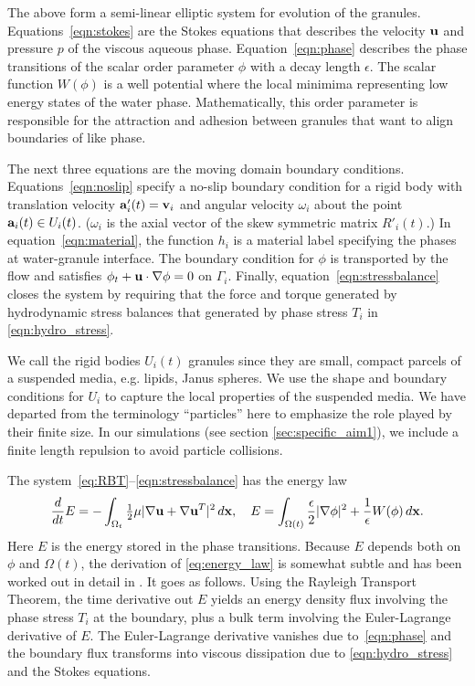 The above form a semi-linear elliptic 
system for evolution of the granules.  Equations~\eqref{eqn:stokes} are the
Stokes equations that describes the velocity $\uu$ and pressure $p$ of
the viscous aqueous phase.  Equation~\eqref{eqn:phase} describes the
phase transitions of the scalar order parameter $\phi$ with a decay
length $\epsilon$.
The scalar function $W(\phi)$ is a well potential where the local 
minimima representing low energy states of the water phase.
Mathematically, this order parameter is responsible for
the attraction and adhesion between granules that want to align boundaries
of like phase.

The next three equations are the moving domain boundary conditions.
Equations~\eqref{eqn:noslip} specify a no-slip
boundary condition for a rigid body with translation velocity $\aa'_i(t) = \vv_i$
and angular velocity $\omega_i$
about the point $\aa_i(t) \in U_i(t)$.
($\omega_i$ is the axial vector of the
skew symmetric matrix $R'_i(t)$.)
In
equation~\eqref{eqn:material}, the function $h_i$ is a material label
specifying the phases at water-granule interface.
The boundary condition for $\phi$ is transported by the flow
and satisfies $\phi_t + \uu \cdot \nabla \phi = 0$ on $\Gamma_i$.
Finally,
equation~\eqref{eqn:stressbalance} closes the system by
requiring that the force and torque generated by 
hydrodynamic stress balances that generated by phase stress $T_i$ in
\eqref{eqn:hydro_stress}.

We call the rigid bodies $U_i(t)$ granules since they are small, compact
parcels of a suspended media, e.g. lipids, Janus spheres.
We use the shape and boundary conditions for $U_i$ to capture the local
properties of the suspended media. 
We have departed from the terminology ``particles'' here
to emphasize the role played by their finite size. 
In our simulations (see section \ref{sec:specific_aim1}),
we include a finite length repulsion to avoid particle
collisions.




The system~\eqref{eq:RBT}--\eqref{eqn:stressbalance}
has the energy law
\begin{equation}
\label{eq:energy_law}
  \frac{d}{dt}E
  = - \int_{\Omega_t}\tfrac{1}{2}\mu|\nabla \uu + \nabla
  \uu^T|^2 \,d\xx,\quad
    E = \int_{\Omega(t)}
  \frac{\epsilon}{2} |\nabla \phi|^2 + \frac{1}{\epsilon} W(\phi) \,d\xx.
\end{equation}
Here $E$ is the energy stored in the phase transitions.
Because $E$ depends both on $\phi$ and $\Omega(t)$,
the derivation of \eqref{eq:energy_law}
is somewhat subtle and has been worked out in detail in \cite{Fu2018_SIAM}.
It goes as follows.
Using the Rayleigh Transport Theorem, 
the time derivative out $E$ yields an energy
density flux involving the phase stress $T_i$
at the boundary, plus a bulk term involving 
the Euler-Lagrange derivative of $E.$
The Euler-Lagrange derivative vanishes due to~\eqref{eqn:phase}
and the boundary flux transforms into viscous dissipation due to 
\eqref{eqn:hydro_stress} and the Stokes equations. 

